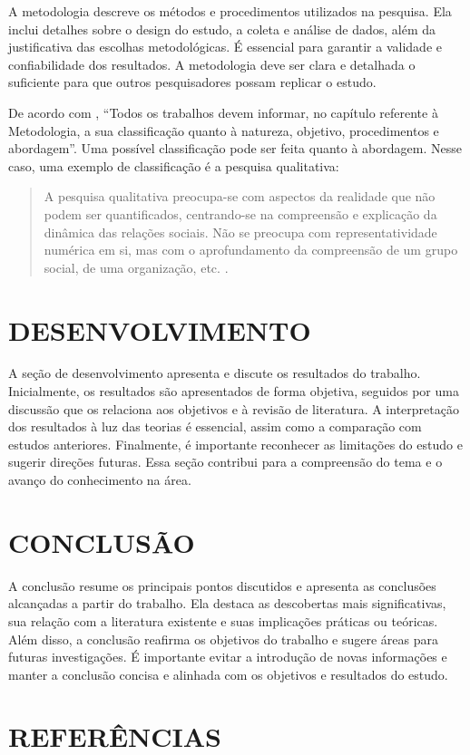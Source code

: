 \documentclass[atividade]{iftex2024}
\begin{document}
A metodologia descreve os métodos e procedimentos utilizados na pesquisa.
Ela inclui detalhes sobre o design do estudo, a coleta e análise de dados, além da justificativa das escolhas metodológicas.
É essencial para garantir a validade e confiabilidade dos resultados.
A metodologia deve ser clara e detalhada o suficiente para que outros pesquisadores possam replicar o estudo.

De acordo com \citet{ifmg:2021:tcc}, \enquote{Todos os trabalhos devem informar, no capítulo referente à Metodologia, a sua classificação quanto à natureza, objetivo, procedimentos e abordagem}.
Uma possível classificação pode ser feita quanto à abordagem.
Nesse caso, uma exemplo de classificação é a pesquisa qualitativa:
\begin{quote}
A pesquisa qualitativa preocupa-se com aspectos da realidade que não podem ser quantificados, centrando-se na compreensão e explicação da dinâmica das relações sociais.
Não se preocupa com representatividade numérica em si, mas com o aprofundamento da compreensão de um grupo social, de uma organização, etc.
\cite{ifmg:2021:tcc}.
\end{quote}

\chapter{DESENVOLVIMENTO}

A seção de desenvolvimento apresenta e discute os resultados do trabalho.
Inicialmente, os resultados são apresentados de forma objetiva, seguidos por uma discussão que os relaciona aos objetivos e à revisão de literatura.
A interpretação dos resultados à luz das teorias é essencial, assim como a comparação com estudos anteriores.
Finalmente, é importante reconhecer as limitações do estudo e sugerir direções futuras.
Essa seção contribui para a compreensão do tema e o avanço do conhecimento na área.

\chapter{CONCLUSÃO}

A conclusão resume os principais pontos discutidos e apresenta as conclusões alcançadas a partir do trabalho.
Ela destaca as descobertas mais significativas, sua relação com a literatura existente e suas implicações práticas ou teóricas.
Além disso, a conclusão reafirma os objetivos do trabalho e sugere áreas para futuras investigações.
É importante evitar a introdução de novas informações e manter a conclusão concisa e alinhada com os objetivos e resultados do estudo.

\chapter*{REFERÊNCIAS}

\printbibliography
\end{document}
